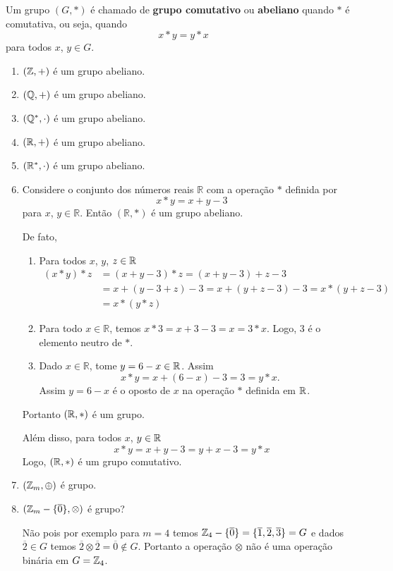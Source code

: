 \begin{definicao}
	Um grupo $(G,*)$ {\'e} chamado de \textbf{grupo comutativo} ou \textbf{abeliano} quando $*$ {\'e} comutativa, ou seja, quando
	\[
		x*y = y*x
	\]
	para todos $x$, $y \in G$.
\end{definicao}

\begin{exemplos}
	\begin{enumerate}[label={\arabic*})]
		\item $(\mathbb{Z},+)$ {\'e} um grupo abeliano.
		\item $(\mathbb{Q},+)$ {\'e} um grupo abeliano.
		\item $(\mathbb{Q}^*,\cdot)$ {\'e} um grupo abeliano.
		\item $(\mathbb{R},+)$ {\'e} um grupo abeliano.
		\item $(\mathbb{R}^*,\cdot)$ {\'e} um grupo abeliano.
		\item Considere o conjunto dos n{\'u}meros reais $\mathbb{R}$ com a opera{\c c}{\~a}o $*$ definida por
		\[
			x*y = x + y - 3
		\]
		para $x$, $y \in \mathbb{R}$. Ent{\~a}o $(\mathbb{R}, *)$ {\'e} um grupo abeliano.
		\begin{solucao}
			De fato,
			\begin{enumerate}[label={\roman*})]
				\item Para todos $x$, $y$, $z \in \mathbb{R}$
				\begin{align*}
					(x*y)*z &= (x+y-3)*z = (x+y-3)+z-3\\
					&= x+(y-3+z)-3 = x+(y+z-3)-3 = x*(y+z-3)\\
					&= x*(y*z)
				\end{align*}

				\item Para todo $x \in \mathbb{R}$, temos $x*3 = x + 3 - 3 = x = 3 * x$. Logo, 3 {\'e} o elemento neutro de $*$.

				\item Dado $x \in \mathbb{R}$, tome $y = 6 - x \in \mathbb{R}$. Assim
				\[
					x*y = x + (6-x)-3 = 3 = y*x.
				\]
				Assim $y = 6 - x$ \'e o oposto de $x$ na opera\c{c}\~ao $*$ definida em $\mathbb{R}$.
			\end{enumerate}

			Portanto $(\mathbb{R}, *)$ \'e um grupo.

			Al\'em disso, para todos $x$, $y \in \mathbb{R}$
			\[
				x*y = x + y - 3 = y + x - 3 = y*x
			\]
			Logo, $(\mathbb{R}, *)$ {\'e} um grupo comutativo.
		\end{solucao}

		\item $(\mathbb{Z}_m,\oplus)$ {\'e} grupo.

		\item $(\mathbb{Z}_m-\{\overline{0}\},\otimes)$ {\'e} grupo?
		\begin{solucao}
			N\~ao pois por exemplo para $m = 4$ temos $\mathbb{Z}_4-\{\overline{0}\} = \{\overline{1}, \overline{2}, \overline{3}\} = G$ e dados $\overline{2}\in G$ temos $\overline{2} \otimes \overline{2} = \overline{0} \notin G$. Portanto a opera\c{c}\~ao $\otimes$ n\~ao \'e uma opera\c{c}\~ao bin\'aria em $G = \mathbb{Z}_4$.
		\end{solucao}
	\end{enumerate}
\end{exemplos}

